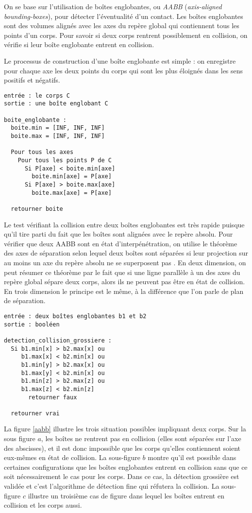 On se base sur l'utilisation de boîtes englobantes, ou \textit{AABB}
(\textit{axis-aligned bounding-boxes}), pour détecter l'éventualité
d'un contact. Les boîtes englobantes sont des volumes alignés avec les
axes du repère global qui contiennent tous les points d'un corps. Pour
savoir si deux corps rentrent possiblement en collision, on vérifie si
leur boîte englobante entrent en collision.

Le processus de construction d'une boîte englobante est simple : on
enregistre pour chaque axe les deux points du corps qui sont les plus
éloignés dans les sens positifs et négatifs.

\begin{verbatim}
entrée : le corps C
sortie : une boîte englobant C

boite_englobante :
  boite.min = [INF, INF, INF]
  boite.max = [INF, INF, INF]

  Pour tous les axes
    Pour tous les points P de C
      Si P[axe] < boite.min[axe]
        boite.min[axe] = P[axe]
      Si P[axe] > boite.max[axe]
        boite.max[axe] = P[axe]

  retourner boite
\end{verbatim}

Le test vérifiant la collision entre deux boîtes englobantes est très
rapide puisque qu'il tire parti du fait que les boîtes sont alignées
avec le repère absolu. Pour vérifier que deux AABB sont en état
d'interpénétration, on utilise le théorème des axes de séparation
selon lequel deux boîtes sont séparées si leur projection sur au moins
un axe du repère absolu ne se superposent pas \cite{ericson05}. En
deux dimension, on peut résumer ce théorème par le fait que si une
ligne parallèle à un des axes du repère global sépare deux corps,
alors ils ne peuvent pas être en état de collision. En trois dimension
le principe est le même, à la différence que l'on parle de plan de
séparation.

\begin{verbatim}
entrée : deux boîtes englobantes b1 et b2
sortie : booléen

detection_collision_grossiere :
  Si b1.min[x] > b2.max[x] ou
     b1.max[x] < b2.min[x] ou
     b1.min[y] > b2.max[x] ou
     b1.max[y] < b2.min[x] ou
     b1.min[z] > b2.max[z] ou
     b1.max[z] < b2.min[z]
       retourner faux

  retourner vrai
\end{verbatim}

La figure \ref{aabb} illustre les trois situation possibles impliquant
deux corps. Sur la sous figure $a$, les boîtes ne rentrent pas en
collision (elles sont séparées sur l'axe des abscisses), et il est
donc impossible que les corps qu'elles contiennent soient eux-mêmes en
état de collision. La sous-figure $b$ montre qu'il est possible dans
certaines configurations que les boîtes englobantes entrent en
collision sans que ce soit nécessairement le cas pour les corps. Dans
ce cas, la détection grossière est validée et c'est l'algorithme de
détection fine qui réfutera la collision. La sous-figure $c$ illustre
un troisième cas de figure dans lequel les boîtes entrent en collision
et les corps aussi.

